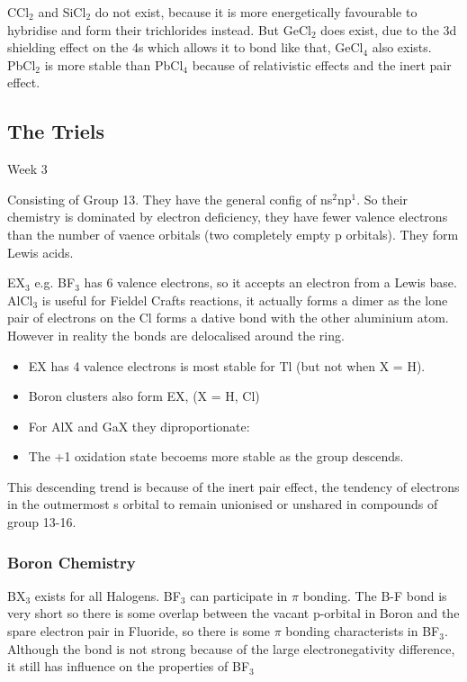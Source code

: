 \documentclass{article}
\renewcommand{\sup}[1]{\(^#1\)}
\newcommand{\sub}[1]{\(_#1\)}
\newcommand{\thedate}[1]{\hfill{\small\sc #1}}
\begin{document}
    CCl\(_2\) and SiCl\(_2\) do not exist, because it is more energetically favourable to hybridise and form 
    their trichlorides instead. But GeCl\(_2\) does exist, due to the 3d shielding effect on the 4s which allows
    it to bond like that, GeCl\(_4\) also exists. PbCl\(_2\) is more stable than PbCl\(_4\) because of relativistic
    effects and the inert pair effect.

    \subsection{The Triels}\thedate{Week 3}
    
    \vspace{0.4cm}
    Consisting of Group 13. They have the general config of ns\sup{2}np\sup{1}. So their chemistry is dominated
    by electron deficiency, they have fewer valence electrons than the number of vaence orbitals (two completely empty p orbitals). 
    They form Lewis acids.
    
    EX\sub{3} e.g. BF\sub{3} has 6 valence electrons, so it accepts an electron from a Lewis base. 
    AlCl\sub{3} is useful for Fieldel Crafts reactions, it actually forms a dimer as the lone pair of electrons
    on the Cl forms a dative bond with the other aluminium atom. However in reality the bonds are delocalised around
    the ring. 
    \begin{figure}[h]
        \centering
    \end{figure}
    \begin{itemize}
        \item EX has 4 valence electrons is most stable for Tl (but not when X = H). 
        \item Boron clusters also form EX, (X = H, Cl)
        \item For AlX and GaX they diproportionate: \ce{3MX -> 2M + MX\sub{3}}
        \item The +1 oxidation state becoems more stable as the group descends.
    \end{itemize}
    This descending trend is because of the inert pair effect, the tendency of electrons in the outmermost s orbital to 
    remain unionised or unshared in compounds of group 13-16.

    \subsubsection{Boron Chemistry}
    BX\sub{3} exists for all Halogens. BF\sub{3} can participate in $\pi$ bonding.
    The B-F bond is very short so there is some overlap between the vacant p-orbital in Boron and the spare electron
    pair in Fluoride, so there is some $\pi$ bonding characterists in BF\sub{3}. Although the bond is not strong
    because of the large electronegativity difference, it still has influence on the properties of BF\sub{3}
\end{document}
